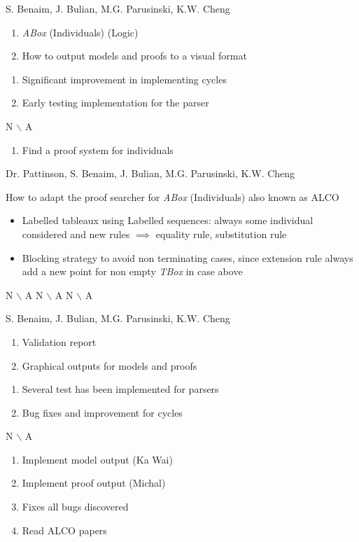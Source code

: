 %
{S. Benaim, J. Bulian, M.G. Parusinski, K.W. Cheng}%
{\begin{enumerate}
\item \emph{ABox} (Individuals) (Logic)
\item How to output models and proofs to a visual format
\end{enumerate}
}%
{\begin{enumerate}
\item Significant improvement in implementing cycles
\item Early testing implementation for the parser
\end{enumerate}}%
{N $\backslash$ A}
{\begin{enumerate}
\item Find a proof system for individuals
\end{enumerate}}%

%
{Dr. Pattinson, S. Benaim, J. Bulian, M.G. Parusinski, K.W. Cheng}%
{How to adapt the proof searcher for \emph{ABox} (Individuals) also known as ALCO 
\begin{itemize}
\item Labelled tableaux using Labelled sequences: always some individual considered and new rules $\implies$ equality rule, substitution rule
\item Blocking strategy to avoid non terminating cases, since extension rule always add a new point for non empty \emph{TBox} in case above
\end{itemize}
}%
{N $\backslash$ A}%
{N $\backslash$ A}
{N $\backslash$ A}%

%
{S. Benaim, J. Bulian, M.G. Parusinski, K.W. Cheng}%
{\begin{enumerate}
\item Validation report
\item Graphical outputs for models and proofs
\end{enumerate}
}%
{\begin{enumerate}
\item Several test has been implemented for parsers
\item Bug fixes and improvement for cycles
\end{enumerate}
}%
{{N $\backslash$ A}}
{\begin{enumerate}
\item Implement model output (Ka Wai)
\item Implement proof output (Michal)
\item Fixes all bugs discovered
\item Read ALCO papers
\end{enumerate}}%


